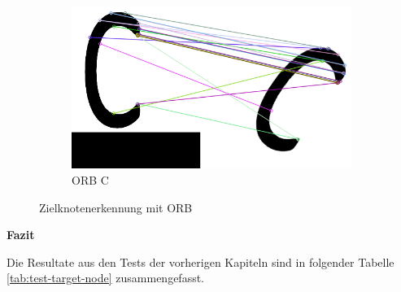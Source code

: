 \begin{figure}[H]
\begin{subfigure}{0.3\textwidth}
\label{fig:orb-b}
\end{subfigure}
\begin{subfigure}{0.3\textwidth}
\includegraphics[width=0.95\linewidth]{assets/informatik-prototyp/opencv/target_node_detection/orb-c.png} 
\caption{ORB C}
\label{fig:orb-c}
\end{subfigure}

\caption{Zielknotenerkennung mit ORB}
\label{fig:orb-zielknoten}
\end{figure}

\textbf{Fazit}

Die Resultate aus den Tests der vorherigen Kapiteln sind in folgender Tabelle \ref{tab:test-target-node} zusammengefasst.

